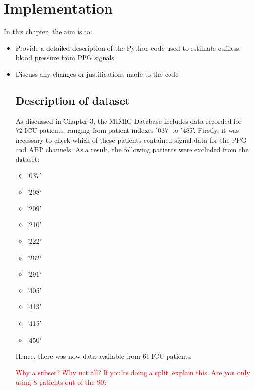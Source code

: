 \section{Implementation}
In this chapter, the aim is to:

\begin{itemize}
    \item Provide a detailed description of the Python code used to estimate cuffless blood pressure from PPG signals
    \item Discuss any changes or justifications made to the code

\subsection{Description of dataset}
As discussed in Chapter 3, the MIMIC Database includes data
recorded for 72 ICU patients, ranging from patient indexes '037' to '485'. Firstly, it was necessary to check which 
of these patients contained signal data for the PPG and ABP channels. As a result, the following patients were excluded from the dataset:
\begin{itemize}
    \item '037'
    \item '208'
    \item '209'
    \item '210'
    \item '222'
    \item '262'
    \item '291'
    \item '405'
    \item '413'
    \item '415'
    \item '450'
\end{itemize}\noindent Hence, there was now data available from 61 ICU patients.

\textcolor{red}{Why a subset? Why not all? If you're doing a split, explain this. Are you only using 8 patients out of the 90?}


\end{itemize}
